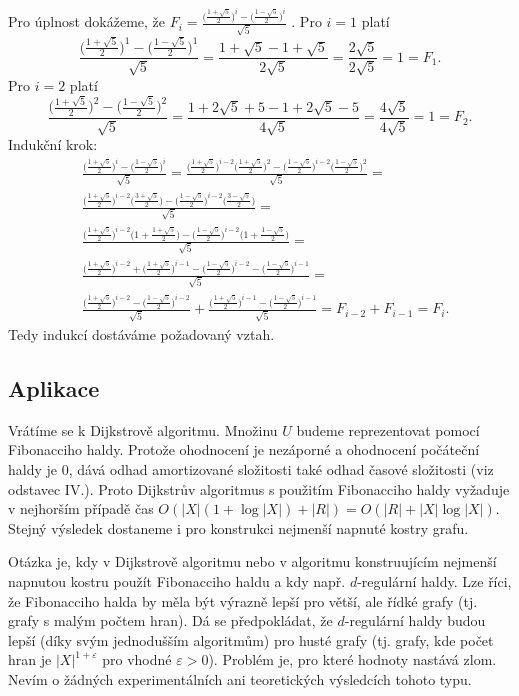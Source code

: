 \documentclass[a4paper,12pt]{article}
\begin{document}
Pro úplnost dokážeme, že $F_i=\frac {\big(\frac {
1+\sqrt 5}2\big)^i-\big(\frac {1-\sqrt 5}2\big)^i}{\sqrt 5}$ .\newline 
Pro $i=1$ platí 
$$\frac {\big(\frac {1+\sqrt 5}2\big)^1-\big(\frac {1-\sqrt 5}2\big
)^1}{\sqrt 5}=\frac {1+\sqrt 5-1+\sqrt 5}{2\sqrt 5}=\frac {2\sqrt 
5}{2\sqrt 5}=1=F_1.$$
Pro $i=2$ platí 
$$\frac {\big(\frac {1+\sqrt 5}2\big)^2-\big(\frac {1-\sqrt 5}2\big
)^2}{\sqrt 5}=\frac {1+2\sqrt 5+5-1+2\sqrt 5-5}{4\sqrt 5}=\frac {
4\sqrt 5}{4\sqrt 5}=1=F_2.$$
Indukční krok:
\begin{align*}&\frac {\big(\frac {1+\sqrt 5}2\big)^i-\big(\frac {1-\sqrt 
5}2\big)^i}{\sqrt 5}=\frac {\big(\frac {1+\sqrt 5}2\big)^{i-2}\big
(\frac {1+\sqrt 5}2\big)^2-\big(\frac {1-\sqrt 5}2\big)^{i-2}\big
(\frac {1-\sqrt 5}2\big)^2}{\sqrt 5}=\\
&\frac {\big(\frac {1+\sqrt 5}2\big)^{i-2}\big(\frac {3+\sqrt 5}2\big
)-\big(\frac {1-\sqrt 5}2\big)^{i-2}\big(\frac {3-\sqrt 5}2\big)}{\sqrt 
5}=\\
&\frac {\big(\frac {1+\sqrt 5}2\big)^{i-2}\big(1+\frac {1+\sqrt 5}
2\big)-\big(\frac {1-\sqrt 5}2\big)^{i-2}\big(1+\frac {1-\sqrt 5}
2\big)}{\sqrt 5}=\\
&\frac {\big(\frac {1+\sqrt 5}2\big)^{i-2}+\big(\frac {1+\sqrt 5}
2\big)^{i-1}-\big(\frac {1-\sqrt 5}2\big)^{i-2}-\big(\frac {1-\sqrt 
5}2\big)^{i-1}}{\sqrt 5}=\\
&\frac {\big(\frac {1+\sqrt 5}2\big)^{i-2}-\big(\frac {1-\sqrt 5}
2\big)^{i-2}}{\sqrt 5}+\frac {\big(\frac {1+\sqrt 5}2\big)^{i-1}-\big
(\frac {1-\sqrt 5}2\big)^{i-1}}{\sqrt 5}=F_{i-2}+F_{i-1}=F_i.\end{align*}
Tedy indukcí dostáváme požadovaný vztah.

\subsection{
Aplikace 
}

Vrátíme se k Dijkstrově algoritmu.  
Množinu $U$ bude\-me reprezentovat pomocí Fibonacciho haldy.  
Protože ohodnocení je nezáporné a ohodnocení počáteční haldy 
je $0$, dává odhad amortizované složitosti také odhad časové 
složitosti (viz odstavec IV.).  Proto Dijkstrův 
algoritmus s použitím 
Fibonacciho haldy vyžaduje v nejhorším případě čas 
$O(|X|(1+\log|X|)+|R|)=O(|R|+|X|\log|X|)$.  Stejný výsledek 
dostane\-me i pro konstrukci nejmenší napnuté kostry grafu.  

Otázka je, kdy v Dijkstrově algoritmu nebo v 
algoritmu konstruují\-cím nejmenší napnutou kostru použít Fibonacciho haldu a kdy 
např.  $d$-regu\-lár\-ní haldy. Lze 
říci, že Fibonacciho halda by měla být výrazně lepší pro 
větší, ale řídké grafy (tj. grafy s malým počtem hran). 
Dá se předpokládat, že $d$-regulární haldy budou lepší 
(díky svým jednodušším algoritmům) pro husté 
grafy (tj. grafy, kde počet hran je $|X|^{1+\varepsilon}$ pro vhodné 
$\varepsilon >0$). Problém je, pro které hodnoty nastává zlom. 
Nevím o žádných experimentálních ani teoretických 
výsledcích tohoto typu.
\end{document}

